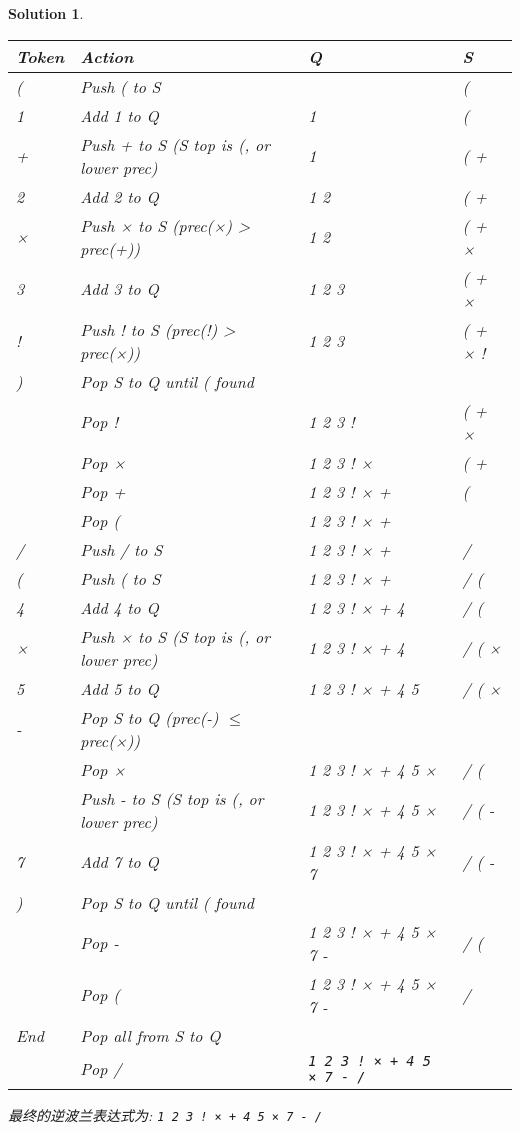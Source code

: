 \documentclass[UTF8]{report}
\newtheorem{solution}{Solution}
\theoremstyle{MyLineTheoremStyle} %
\theoremstyle{MyBlockTheoremStyle} %
\theoremstyle{MySubsubsectionStyle} %
\begin{document}
\begin{solution}
\begin{tabular}{llll}
Token & Action & Q & S \\
\hline
( & Push ( to S & & ( \\
1 & Add 1 to Q & 1 & ( \\
+ & Push + to S (S top is (, or lower prec) & 1 & ( + \\
2 & Add 2 to Q & 1 2 & ( + \\
× & Push × to S (prec(×) > prec(+)) & 1 2 & ( + × \\
3 & Add 3 to Q & 1 2 3 & ( + × \\
! & Push ! to S (prec(!) > prec(×)) & 1 2 3 & ( + × ! \\
) & Pop S to Q until ( found & & \\
  & Pop ! & 1 2 3 ! & ( + × \\
  & Pop × & 1 2 3 ! × & ( + \\
  & Pop + & 1 2 3 ! × + & ( \\
  & Pop ( & 1 2 3 ! × + & \\
/ & Push / to S & 1 2 3 ! × + & / \\
( & Push ( to S & 1 2 3 ! × + & / ( \\
4 & Add 4 to Q & 1 2 3 ! × + 4 & / ( \\
× & Push × to S (S top is (, or lower prec) & 1 2 3 ! × + 4 & / ( × \\
5 & Add 5 to Q & 1 2 3 ! × + 4 5 & / ( × \\
- & Pop S to Q (prec(-) $\le$ prec(×)) & & \\
  & Pop × & 1 2 3 ! × + 4 5 × & / ( \\
  & Push - to S (S top is (, or lower prec) & 1 2 3 ! × + 4 5 × & / ( - \\
7 & Add 7 to Q & 1 2 3 ! × + 4 5 × 7 & / ( - \\
) & Pop S to Q until ( found & & \\
  & Pop - & 1 2 3 ! × + 4 5 × 7 - & / ( \\
  & Pop ( & 1 2 3 ! × + 4 5 × 7 - & / \\
End & Pop all from S to Q & & \\
  & Pop / & \texttt{1 2 3 ! × + 4 5 × 7 - /} & \\
\hline
\end{tabular}

最终的逆波兰表达式为: \texttt{1 2 3 ! × + 4 5 × 7 - /}
\end{solution}
\end{document}
